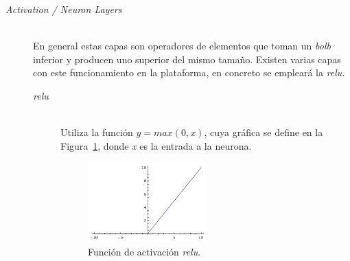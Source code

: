 \begin{description}
\vspace{15pt}	
\item[\textit{Activation / Neuron Layers}] \hfill  
\vspace{10pt}
\\
	En general estas capas son operadores de elementos que toman un \textit{bolb} inferior y producen uno superior del mismo tamaño. Existen varias capas con este funcionamiento en la plataforma, en concreto se empleará la \textit{\acrfull{relu}}.
	\vspace{10pt}
	\begin{description}
	\item[\textit{\acrshort{relu}}] \hfill  
	\vspace{5pt}
	\\
		Utiliza la función $y=max(0,x)$, cuya gráfica se define en la Figura~\ref{fig.reLu}, donde \textit{x} es la entrada a la neurona.
		\begin{figure}[H]
			\begin{center}
				\includegraphics[width=0.5\textwidth]{figures/relu.jpeg}
				\caption{Función de activación \textit{{relu}}.}
				\label{fig.reLu}
			\end{center}
		\end{figure} 
	\end{description}
	

\end{description}
